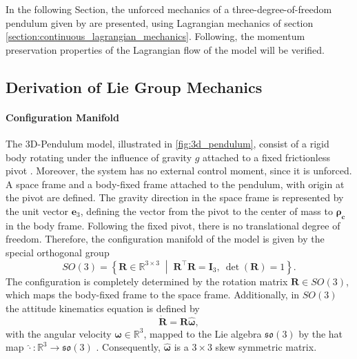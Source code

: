 In the following Section, the unforced mechanics of a three-degree-of-freedom pendulum given by \cite{Lee2008} are presented, using Lagrangian mechanics of section \ref{section:continuous_lagrangian_mechanics}. Following, the momentum preservation properties of the Lagrangian flow of the model will be verified. 

\subsection{Derivation of Lie Group Mechanics}

\paragraph{Configuration Manifold}


The 3D-Pendulum model, illustrated in \ref{fig:3d_pendulum}, consist of a rigid body rotating under the influence of gravity $g$ attached to a fixed frictionless pivot \cite{Shen20043DPendulum}. Moreover, the system has no external control moment, since it is unforced. A space frame and a body-fixed frame attached to the pendulum, with origin at the pivot are defined. The gravity direction in the space frame is represented by the unit vector $\bm{e}_3$, defining the vector from the pivot to the center of mass to $\bm{\rho_{c}}$ in the body frame. Following the fixed pivot, there is no translational degree of freedom. Therefore, the configuration manifold of the model is given by the special orthogonal group
\[
SO(3)
=
\left\{
\bm{R}\in\mathbb{R}^{3\times 3}
\;\middle|\;
\bm{R}^\top \bm{R}=\bm{I}_3,\ 
\det(\bm{R})=1
\right\}.\]
The configuration is completely determined by the rotation matrix $\bm{R}\in SO(3)$, which maps the body-fixed frame to the space frame. Additionally, in $SO(3)$ the attitude kinematics equation is defined by 
\begin{equation}
\label{eq:SO3_attitude_kinematics}
\bm{\dot{R}} = \bm{R}\hat{\bm{\omega}},
\end{equation}
with the angular velocity $\bm{\omega}\in \mathbb{R}^3$, mapped to the Lie algebra $\mathfrak{so}(3)$ by the hat map $\hat{\cdot}: \mathbb{R}^3 \to \mathfrak{so}(3)$ \cite{Lee2008}. Consequently, $\hat{\bm{\omega}}$ is a $3 \times 3$ skew symmetric matrix. 


